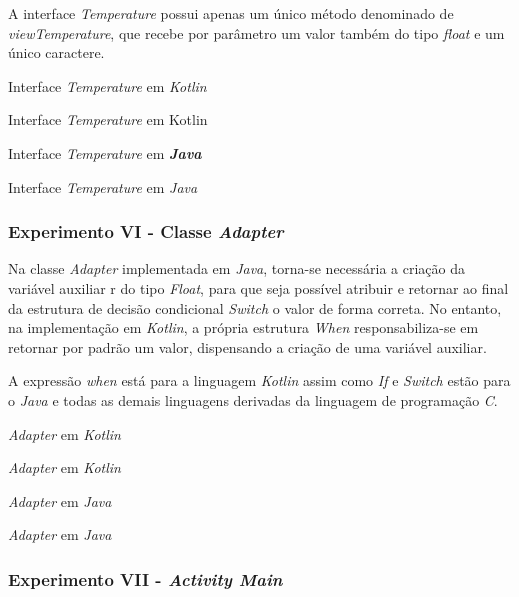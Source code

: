 A interface \textit{Temperature} possui apenas um único método denominado de \textit{viewTemperature}, que recebe por parâmetro um valor também do tipo \textit{float} e um único caractere.

Interface \textit{Temperature} em \textit{Kotlin}
\caption{Interface \textit{Temperature} em Kotlin}
 

Interface \textit{Temperature} em \textbf{\textit{Java}}
\caption{Interface \textit{Temperature} em \textit{Java}}
 


\subsubsection{Experimento VI - Classe \textit{Adapter}}

Na classe \textit{Adapter} implementada em \textit{Java}, torna-se necessária a criação da variável auxiliar r do tipo \textit{Float}, para que seja possível atribuir e retornar ao final da estrutura de decisão condicional \textit{Switch} o valor de forma correta. No entanto, na implementação em \textit{Kotlin}, a própria estrutura \textit{When} responsabiliza-se em retornar por padrão um valor, dispensando a criação de uma variável auxiliar.

A expressão \textit{when} está para a linguagem \textit{Kotlin} assim como \textit{If} e \textit{Switch} estão para o \textit{Java} e todas as demais linguagens derivadas da linguagem de programação \textit{C}.


\textit{Adapter} em \textit{Kotlin}
\caption{\textit{Adapter} em \textit{Kotlin}}
 

\textit{Adapter} em \textit{Java}
\caption{\textit{Adapter} em \textit{Java}}
 


\subsubsection{Experimento VII - \textit{Activity Main}} 

